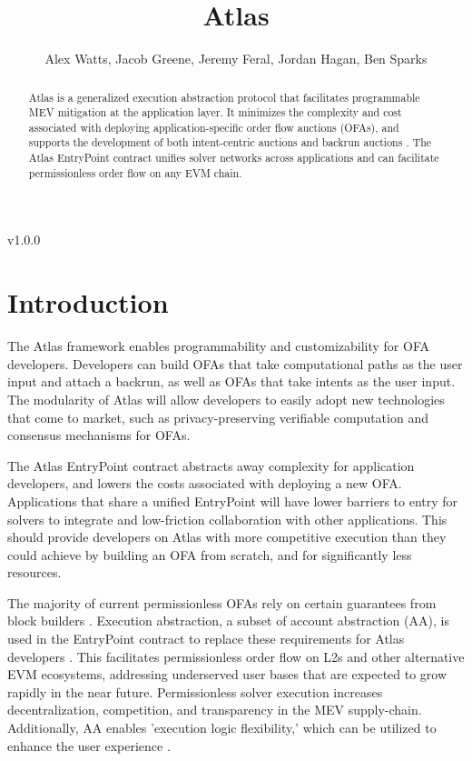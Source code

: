 \documentclass{article}
\title{Atlas}
\author{Alex Watts, Jacob Greene, Jeremy Feral, Jordan Hagan, Ben Sparks}
\begin{document}
\maketitle

\begin{center}
  v1.0.0
\end{center}

\begin{abstract}
Atlas is a generalized execution abstraction \cite{yoav} protocol that facilitates programmable MEV mitigation at the application layer. It minimizes the complexity and cost associated with deploying application-specific order flow auctions (OFAs), and supports the development of both intent-centric auctions and backrun auctions \cite{paradigm}. The Atlas EntryPoint contract unifies solver networks across applications and can facilitate permissionless order flow on any EVM chain.
\end{abstract}

\section{Introduction}

The Atlas framework enables programmability and customizability for OFA developers. Developers can build OFAs that take computational paths as the user input and attach a backrun, as well as OFAs that take intents as the user input. The modularity of Atlas will allow developers to easily adopt new technologies that come to market, such as privacy-preserving verifiable computation and consensus mechanisms for OFAs. 

The Atlas EntryPoint contract abstracts away complexity for application developers, and lowers the costs associated with deploying a new OFA. Applications that share a unified EntryPoint will have lower barriers to entry for solvers to integrate and low-friction collaboration with other applications. This should provide developers on Atlas with more competitive execution than they could achieve by building an OFA from scratch, and for significantly less resources. 

The majority of current permissionless OFAs rely on certain guarantees from block builders \cite{share}. {Execution abstraction}, a subset of account abstraction (AA), is used in the EntryPoint contract to replace these requirements for Atlas developers \cite{AA}. This facilitates permissionless order flow on L2s and other alternative EVM ecosystems, addressing underserved user bases that are expected to grow rapidly in the near future. Permissionless solver execution increases decentralization, competition, and transparency in the MEV supply-chain. Additionally, AA enables {'execution logic flexibility,'} which can be utilized to enhance the user experience \cite{vitalik}.
\end{document}
